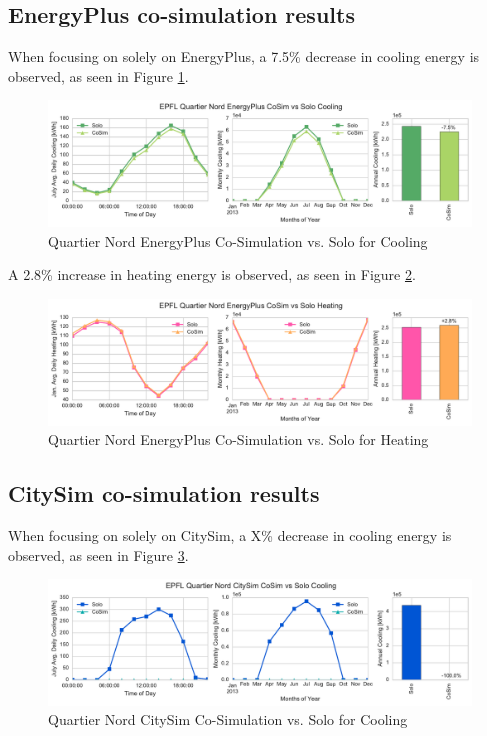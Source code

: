 \documentclass{tBPS2e}
\theoremstyle{plain}
\theoremstyle{definition}
\theoremstyle{remark}
\begin{document}
\subsection{EnergyPlus co-simulation results}

When focusing on solely on EnergyPlus, a 7.5\% decrease in cooling energy is observed, as seen in Figure \ref{fig:qn_eplus_cosimvssolo_cooling}.

\begin{figure}[H]
\centering
\includegraphics[scale=0.55]{figures/QN_EnergyPlus_Cooling}
\caption{Quartier Nord EnergyPlus Co-Simulation vs. Solo for Cooling}
\label{fig:qn_eplus_cosimvssolo_cooling}
\end{figure}

A 2.8\% increase in heating energy is observed, as seen in Figure \ref{fig:qn_eplus_cosimvssolo_heating}.


\begin{figure}[H]
\centering
\includegraphics[scale=0.55]{figures/QN_EnergyPlus_Heating}
\caption{Quartier Nord EnergyPlus Co-Simulation vs. Solo for Heating}
\label{fig:qn_eplus_cosimvssolo_heating}
\end{figure}

\subsection{CitySim co-simulation results}

When focusing on solely on CitySim, a X\% decrease in cooling energy is observed, as seen in Figure \ref{fig:qn_citysim_cosimvssolo_cooling}.


\begin{figure}[H]
\centering
\includegraphics[scale=0.55]{figures/QN_CitySim_Cooling}
\caption{Quartier Nord CitySim Co-Simulation vs. Solo for Cooling}
\label{fig:qn_citysim_cosimvssolo_cooling}
\end{figure}
\end{document}
